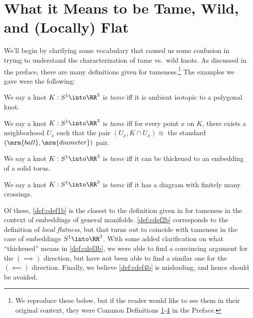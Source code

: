 \section{What it Means to be Tame, Wild, and (Locally)
  Flat}\label{sec:tame-wild-definitions}
We'll begin by clarifying some vocabulary that caused us some
confusion in trying to understand the characterization of tame vs.\
wild knots. As discussed in the preface, there are many definitions
given for tameness.\footnote{We reproduce these below, but if the
  reader would like to see them in their original context, they were
  Common Definitions \hyperlink{def:cdef1}{1}-\hyperlink{def:cdef4}{4}
  in the Preface.} The examples we gave were the following:
\begin{leftbar}\vspace{-.3725cm}
  \setcounter{commondefx}{0}
  \begin{commondef}\label{def:cdef1b}
    We say a knot $K : S^1 \into \RR^3$ is \emph{tame} iff it is
    ambient isotopic to a polygonal knot.
  \end{commondef}
  \begin{commondef}\label{def:cdef2b}
    We say a knot $K : S^1 \into \RR^3$ is \emph{tame} iff for every
    point $x$ on $K$, there exists a neighborhood $U_x$ such that the
    pair $(U_x, K \cap U_x) \cong $ the standard $(\mrm{ball},
    \mrm{diameter})$ pair.
  \end{commondef}
  \begin{commondef}\label{def:cdef3b}
    We say a knot $K : S^1 \into \RR^3$ is \emph{tame} iff it can be
    thickened to an embedding of a solid torus.
  \end{commondef}
  \begin{commondef}\label{def:cdef4b}
    We say a knot $K : S^1 \into \RR^3$ is \emph{tame} iff it has a
    diagram with finitely many crossings.
  \end{commondef}
\end{leftbar}
Of these, \cref{def:cdef1b} is the closest to the definition given in
\cite{Daverman} for tameness in the context of embeddings of general
manifolds. \cref{def:cdef2b} corresponds to the definition of
\emph{local flatness}, but that turns out to coincide with tameness in
the case of embeddings $S^1 \into \RR^3$. With some added
clarification on what ``thickened'' means in \cref{def:cdef3b}, we
were able to find a convincing argument for the $(\implies)$
direction, but have not been able to find a similar one for the
$(\impliedby)$ direction. Finally, we believe \cref{def:cdef4b} is
misleading, and hence should be avoided.


